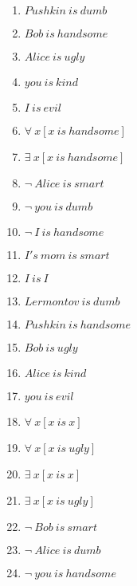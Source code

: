\documentclass{article}
\begin{document}
\begin{enumerate}
\item $Pushkin \ is \ dumb$

\item $Bob \ is \ handsome$

\item $Alice \ is \ ugly$

\item $you \ is \ kind$

\item $I \ is \ evil$

\item $\forall \ x[x \ is \ handsome]$

\item $\exists \ x[x \ is \ handsome]$

\item $\neg \ Alice \ is \ smart$

\item $\neg \ you \ is \ dumb$

\item $\neg \ I \ is \ handsome$

\item $I's \ mom \ is \ smart$

\item $I \ is \ I$

\item $Lermontov \ is \ dumb$

\item $Pushkin \ is \ handsome$

\item $Bob \ is \ ugly$

\item $Alice \ is \ kind$

\item $you \ is \ evil$

\item $\forall \ x[x \ is \ x]$

\item $\forall \ x[x \ is \ ugly]$

\item $\exists \ x[x \ is \ x]$

\item $\exists \ x[x \ is \ ugly]$

\item $\neg \ Bob \ is \ smart$

\item $\neg \ Alice \ is \ dumb$

\item $\neg \ you \ is \ handsome$


\end{enumerate}
\end{document}
